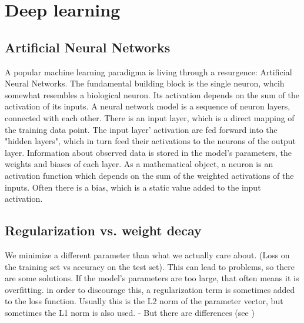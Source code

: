 \documentclass[twoside,12pt,a4paper]{report}
\begin{document}
\section{Deep learning}
\subsection{Artificial Neural Networks}
A popular machine learning paradigma is living through a resurgence: Artificial Neural Networks. The fundamental building block is the single neuron, whcih somewhat resembles a biological neuron. Its activation depends on the sum of the activation of its inputs. A neural network model is a sequence of neuron layers, connected with each other. There is an input layer, which is a direct mapping of the training data point. The input layer' activation are fed forward into the "hidden layers", which in turn feed their activations to the neurons of the output layer. Information about observed data is stored in the model's parameters, the weights and biases of each layer.
As a mathematical object, a neuron is an activation function which depends on the sum of the weighted activations of the inputs. Often there is a bias, which is a static value added to the input activation.



\subsection{Regularization vs. weight decay}
We minimize a different parameter than what we actually care about. (Loss on the training set vs accuracy on the test set). This can lead to problems, so there are some solutions.
If the model's parameters are too large, that often means it is overfitting. in order to discourage this, a regularization term is sometimes added to the loss function. Usually this is the L2 norm of the parameter vector, but sometimes the L1 norm is also used.
- But there are differences (see \cite{DBLP:conf/iclr/ChaudhariCSLBBC17})
\end{document}
